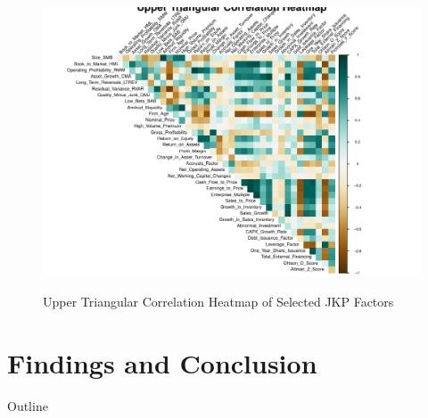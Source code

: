 \documentclass[t]{beamer}
\makeatletter
\def\maxwidth{%
  \ifdim\Gin@nat@width>\linewidth
    \linewidth
  \else
    \Gin@nat@width
  \fi
}
\newenvironment{knitrout}{}{}
\makeatother
\begin{document}
\begin{frame}
\begin{knitrout}
\color{fgcolor}
\begin{figure}
{\centering \includegraphics[width=\maxwidth]{figure/corr_heatmap1-1} }
\caption[Upper Triangular Correlation Heatmap of Selected JKP Factors]{Upper Triangular Correlation Heatmap of Selected JKP Factors}
\label{fig:corr_heatmap1}
\end{figure}
\end{knitrout}
\end{frame}

\section{Findings and Conclusion}

\begin{frame}{Outline}
\end{frame}
\end{document}
